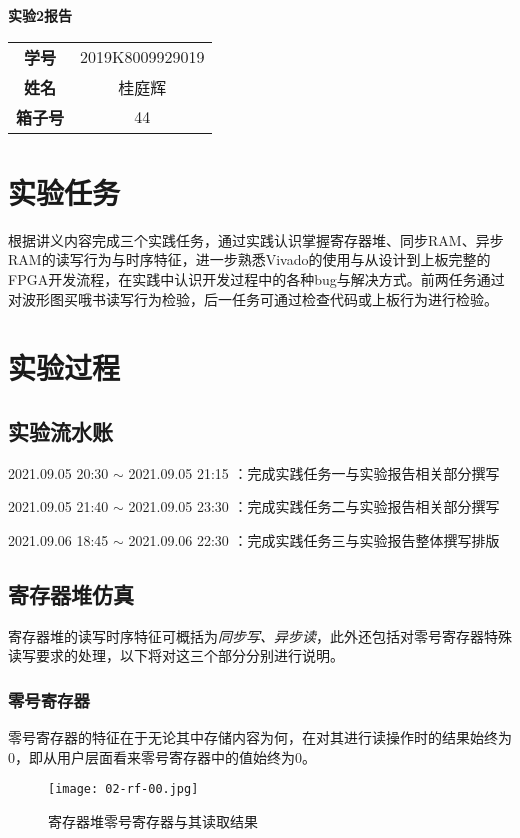 \documentclass[UTF-8,twoside,c5size]{ctexart}
\begin{document}
	\begin{center}
		\bfseries{}
		实验2报告
	\end{center}

	\begin{table*}[!h]
		\raggedleft
		\begin{tabular}{cc}
			\textbf{学号} & {2019K8009929019} \\
			\textbf{姓名} & 桂庭辉 \\
			\textbf{箱子号} & 44
		\end{tabular}
	\end{table*}
	
	\section{实验任务}
	根据讲义内容完成三个实践任务，通过实践认识掌握寄存器堆、同步RAM、异步RAM的读写行为与时序特征，进一步熟悉Vivado的使用与从设计到上板完整的FPGA开发流程，在实践中认识开发过程中的各种bug与解决方式。前两任务通过对波形图买哦书读写行为检验，后一任务可通过检查代码或上板行为进行检验。
	
	\section{实验过程}
	
	\subsection{实验流水账}
	2021.09.05 20:30 $ \sim $ 2021.09.05 21:15 ：完成实践任务一与实验报告相关部分撰写
	
	2021.09.05 21:40 $ \sim $ 2021.09.05 23:30 ：完成实践任务二与实验报告相关部分撰写
	
	2021.09.06 18:45 $ \sim $ 2021.09.06 22:30 ：完成实践任务三与实验报告整体撰写排版
	
	\subsection{寄存器堆仿真}
	寄存器堆的读写时序特征可概括为\textit{同步写、异步读}，此外还包括对零号寄存器特殊读写要求的处理，以下将对这三个部分分别进行说明。	
	
	\subsubsection{零号寄存器}
	零号寄存器的特征在于无论其中存储内容为何，在对其进行读操作时的结果始终为0，即从用户层面看来零号寄存器中的值始终为0。
	\begin{figure}[!h]
		\centering
		\texttt{[image: 02-rf-00.jpg]}
		\caption{寄存器堆零号寄存器与其读取结果}
	\end{figure}
	
\end{document}
